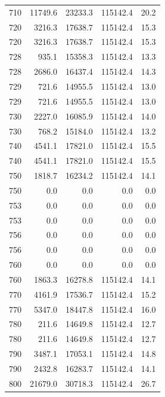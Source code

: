 \begin{longtable}{rrrrr}
    710 & \num{11749.6} & \num{23233.3} & \num{115142.4} & 20.2 \\
    720 & \num{3216.3} & \num{17638.7} & \num{115142.4} & 15.3 \\
    720 & \num{3216.3} & \num{17638.7} & \num{115142.4} & 15.3 \\
    728 & \num{935.1} & \num{15358.3} & \num{115142.4} & 13.3 \\
    728 & \num{2686.0} & \num{16437.4} & \num{115142.4} & 14.3 \\
    729 & \num{721.6} & \num{14955.5} & \num{115142.4} & 13.0 \\
    729 & \num{721.6} & \num{14955.5} & \num{115142.4} & 13.0 \\
    730 & \num{2227.0} & \num{16085.9} & \num{115142.4} & 14.0 \\
    730 & \num{768.2} & \num{15184.0} & \num{115142.4} & 13.2 \\
    740 & \num{4541.1} & \num{17821.0} & \num{115142.4} & 15.5 \\
    740 & \num{4541.1} & \num{17821.0} & \num{115142.4} & 15.5 \\
    750 & \num{1818.7} & \num{16234.2} & \num{115142.4} & 14.1 \\
    750 & \num{0.0} & \num{0.0} & \num{0.0} & 0.0 \\
    753 & \num{0.0} & \num{0.0} & \num{0.0} & 0.0 \\
    753 & \num{0.0} & \num{0.0} & \num{0.0} & 0.0 \\
    756 & \num{0.0} & \num{0.0} & \num{0.0} & 0.0 \\
    756 & \num{0.0} & \num{0.0} & \num{0.0} & 0.0 \\
    760 & \num{0.0} & \num{0.0} & \num{0.0} & 0.0 \\
    760 & \num{1863.3} & \num{16278.8} & \num{115142.4} & 14.1 \\
    770 & \num{4161.9} & \num{17536.7} & \num{115142.4} & 15.2 \\
    770 & \num{5347.0} & \num{18447.8} & \num{115142.4} & 16.0 \\
    780 & \num{211.6} & \num{14649.8} & \num{115142.4} & 12.7 \\
    780 & \num{211.6} & \num{14649.8} & \num{115142.4} & 12.7 \\
    790 & \num{3487.1} & \num{17053.1} & \num{115142.4} & 14.8 \\
    790 & \num{2432.8} & \num{16283.7} & \num{115142.4} & 14.1 \\
    800 & \num{21679.0} & \num{30718.3} & \num{115142.4} & 26.7 \\

\end{longtable}
